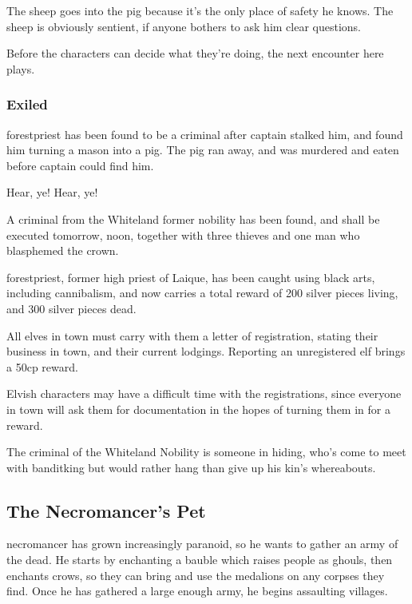 The sheep goes into the \gls{pig} because it's the only place of safety he knows.  The sheep is obviously sentient, if anyone bothers to ask him clear questions.

Before the characters can decide what they're doing, the next encounter here plays.

\subsubsection{ Exiled}

\Gls{forestpriest} has been found to be a criminal after \gls{captain} stalked him, and found him turning a mason into a pig.  The pig ran away, and was murdered and eaten before \gls{captain} could find him.

\begin{speechtext}
	Hear, ye! Hear, ye!

	A criminal from the Whiteland former nobility has been found, and shall be executed tomorrow, noon, together with three thieves and one man who blasphemed the crown.

	\Gls{forestpriest}, former high priest of Laique, has been caught using black arts, including cannibalism, and now carries a total reward of 200 silver pieces living, and 300 silver pieces dead.

	All elves in town must carry with them a letter of registration, stating their business in town, and their current lodgings.  Reporting an unregistered elf brings a 50cp reward.

\end{speechtext}

Elvish characters may have a difficult time with the registrations, since everyone in town will ask them for documentation in the hopes of turning them in for a reward.

The criminal of the Whiteland Nobility is someone in hiding, who's come to meet with \gls{banditking} but would rather hang than give up his kin's whereabouts.

\subsection[The Necromancer's Pet]{The Necromancer's Pet}\label{necromancerspet}

\Gls{necromancer} has grown increasingly paranoid, so he wants to gather an army of the dead.  He starts by enchanting a bauble which raises people as ghouls, then enchants crows, so they can bring and use the medalions on any corpses they find.  Once he has gathered a large enough army, he begins assaulting villages.

